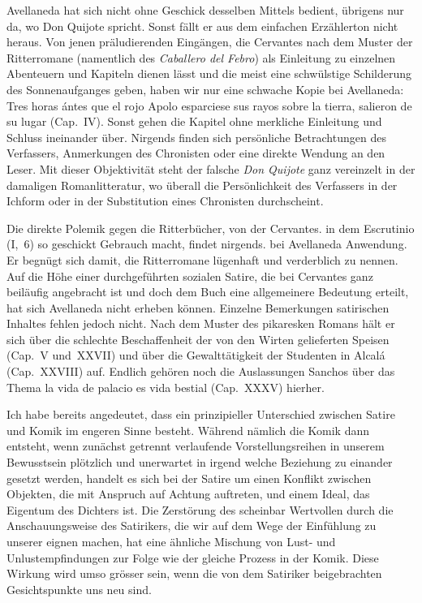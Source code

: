Avellaneda hat sich nicht ohne Geschick desselben Mittels bedient,
übrigens nur da, wo Don Quijote spricht. Sonst fällt er aus dem einfachen
Erzählerton nicht heraus. Von jenen präludierenden Eingängen,
die Cervantes nach dem Muster der Ritterromane (namentlich des
{\it Caballero del Febro\/}) als Einleitung zu einzelnen Abenteuern und
Kapiteln dienen lässt und die meist eine schwülstige Schilderung des
Sonnenaufganges geben, haben wir nur eine schwache Kopie bei
Avellaneda: {\itquoted\spanish Tres horas ántes que el rojo Apolo esparciese sus
rayos sobre la tierra, salieron de su lugar} (Cap.~IV). Sonst gehen die Kapitel
ohne merkliche Einleitung und Schluss ineinander über. Nirgends finden
sich persönliche Betrachtungen des Verfassers, Anmerkungen des
Chronisten oder eine direkte Wendung an den Leser. Mit dieser
Objektivität steht der falsche {\it Don Quijote} ganz vereinzelt in der
damaligen Romanlitteratur, wo überall die Persönlichkeit des Verfassers
in der Ichform oder in der Substitution eines Chronisten durchscheint.

Die direkte Polemik gegen die Ritterbücher, von der Cervantes.
in dem {\itquoted\spanish Escrutinio} (I,~6) so geschickt Gebrauch macht, findet nirgends.
bei Avellaneda Anwendung. Er begnügt sich damit, die Ritterromane
{\quoted lügenhaft} und {\quoted verderblich} zu nennen.
Auf die Höhe einer durchgeführten sozialen Satire, die bei Cervantes
ganz beiläufig angebracht ist und doch dem Buch eine allgemeinere
Bedeutung erteilt, hat sich Avellaneda nicht erheben können. Einzelne
Bemerkungen satirischen Inhaltes fehlen jedoch nicht. Nach dem Muster
des pikaresken Romans hält er sich über die schlechte Beschaffenheit
der von den Wirten gelieferten Speisen (Cap.~V und~XXVII) und über
die Gewalttätigkeit der Studenten in Alcalá (Cap.~XXVIII) auf. Endlich
gehören noch die Auslassungen Sanchos über das Thema {\itquoted\spanish la vida de
palacio es vida bestial} (Cap.~XXXV) hierher.

Ich habe bereits angedeutet, dass ein prinzipieller Unterschied
zwischen Satire und Komik im engeren Sinne besteht. Während nämlich
die Komik dann entsteht, wenn zunächst getrennt verlaufende
Vorstellungsreihen in unserem Bewusstsein plötzlich und unerwartet in irgend
welche Beziehung zu einander gesetzt werden, handelt es sich bei der
Satire um einen Konflikt zwischen Objekten, die mit Anspruch auf
Achtung auftreten, und einem Ideal, das Eigentum des Dichters ist. Die
Zerstörung des scheinbar Wertvollen durch die Anschauungsweise des
Satirikers, die wir auf dem Wege der Einfühlung zu unserer eignen
machen, hat eine ähnliche Mischung von Lust- und Unlustempfindungen
zur Folge wie der gleiche Prozess in der Komik. Diese Wirkung wird
umso grösser sein, wenn die von dem Satiriker beigebrachten
Gesichtspunkte uns neu sind.

